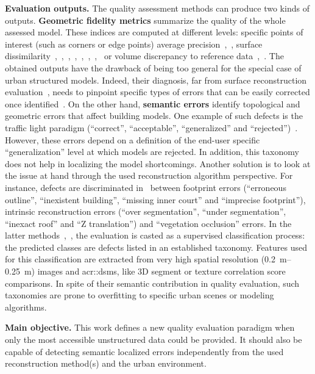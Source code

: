 \documentclass[runningheads]{llncs}
\begin{document}
\noindent
\textbf{Evaluation outputs.}
The quality assessment methods can produce two kinds of outputs. \textbf{Geometric fidelity metrics} summarize the quality of the whole assessed model. These indices are computed at different levels: specific points of interest (such as corners or edge points) average precision~\cite{vogtle2003quality},~\cite{Kaartinen2005}, surface dissimilarity~\cite{jaynes2003recognition},~\cite{dick2004modelling},~\cite{Kaartinen2005},~\cite{zebedin2008fusion},~\cite{lafarge2012creating},~\cite{Zeng2014},~\cite{li2016boxfitting},~\cite{nan2017polyfit} or volume discrepancy to reference data~\cite{jaynes2003recognition},~\cite{Zeng2014}. The obtained outputs have the drawback of being too general for the special case of urban structured models. Indeed, their diagnosis, far from surface reconstruction evaluation~\cite{berger2013benchmark}, needs to pinpoint specific types of errors that can be easily corrected once identified~\cite{OudeElberink2010}. On the other hand, \textbf{semantic errors} identify topological and geometric errors that affect building models. One example of such defects is the traffic light paradigm (``correct'', ``acceptable'', ``generalized'' and ``rejected'')~\cite{boudet2006supervised}. However, these errors depend on a  definition of the end-user specific ``generalization'' level at which models are rejected. In addition, this taxonomy does not help in localizing the model shortcomings. Another solution is to look at the issue at hand through the used reconstruction algorithm perspective. For instance, defects are discriminated in~\cite{Michelin2013} between footprint errors (``erroneous outline'', ``inexistent building'', ``missing inner court'' and ``imprecise footprint''), intrinsic reconstruction errors (``over segmentation'', ``under segmentation'', ``inexact roof'' and ``Z translation'') and ``vegetation occlusion'' errors. In the latter methods~\cite{boudet2006supervised},~\cite{Michelin2013}, the evaluation is casted as a supervised classification process: the predicted classes are defects listed in an established taxonomy. Features used for this classification are extracted from very high spatial resolution (\SIrange{0.2}{0.25}{\m}) images and \glspl{acr::dsm}, like 3D segment or texture correlation score comparisons. In spite of their semantic contribution in quality evaluation, such taxonomies are prone to overfitting to specific urban scenes or modeling algorithms.

\noindent
\textbf{Main objective.}
This work defines a new quality evaluation paradigm when only the most accessible unstructured data could be provided. It should also be capable of detecting semantic localized errors independently from the used reconstruction method(s) and the urban environment.
\end{document}
